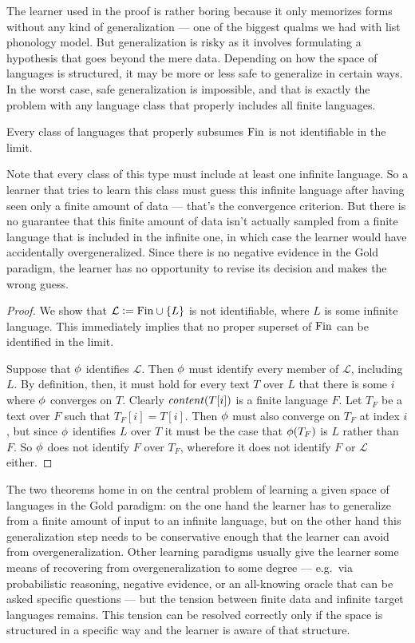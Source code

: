 The learner used in the proof is rather boring because it only memorizes forms without any kind of generalization --- one of the biggest qualms we had with list phonology model.
But generalization is risky as it involves formulating a hypothesis that goes beyond the mere data.
Depending on how the space of languages is structured, it may be more or less safe to generalize in certain ways.
In the worst case, safe generalization is impossible, and that is exactly the problem with any language class that properly includes all finite languages.
%
\begin{theorem}
    Every class of languages that properly subsumes $\mathrm{Fin}$ is not identifiable in the limit.
\end{theorem}
%
Note that every class of this type must include at least one infinite language.
So a learner that tries to learn this class must guess this infinite language after having seen only a finite amount of data --- that's the convergence criterion.
But there is no guarantee that this finite amount of data isn't actually sampled from a finite language that is included in the infinite one, in which case the learner would have accidentally overgeneralized.
Since there is no negative evidence in the Gold paradigm, the learner has no opportunity to revise its decision and makes the wrong guess.
%
\begin{proof}
    We show that $\mathcal{L} \mathrel{\mathop:}= \mathrm{Fin} \cup \left \{ L \right \}$ is not identifiable, where $L$ is some infinite language.
    This immediately implies that no proper superset of $\mathrm{Fin}$ can be identified in the limit.

    Suppose that $\phi$ identifies $\mathcal{L}$.
    Then $\phi$ must identify every member of $\mathcal{L}$, including $L$.
    By definition, then, it must hold for every text $T$ over $L$ that there is some $i$ where $\phi$ converges on $T$.
    Clearly $\mathit{content}(T[i])$ is a finite language $F$.
    Let $T_F$ be a text over $F$ such that $T_F[i] = T[i]$.
    Then $\phi$ must also converge on $T_F$ at index $i$, but since $\phi$ identifies $L$ over $T$ it must be the case that $\phi(T_F)$ is $L$ rather than $F$.
    So $\phi$ does not identify $F$ over $T_F$, wherefore it does not identify $F$ or $\mathcal{L}$ either.
\end{proof}

The two theorems home in on the central problem of learning a given space of languages in the Gold paradigm: on the one hand the learner has to generalize from a finite amount of input to an infinite language, but on the other hand this generalization step needs to be conservative enough that the learner can avoid from overgeneralization.
Other learning paradigms usually give the learner some means of recovering from overgeneralization to some degree --- e.g.\ via probabilistic reasoning, negative evidence, or an all-knowing oracle that can be asked specific questions --- but the tension between finite data and infinite target languages remains.
This tension can be resolved correctly only if the space is structured in a specific way and the learner is aware of that structure.

